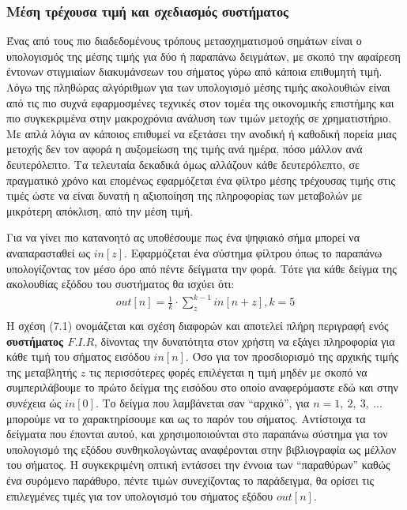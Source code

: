 \documentclass[breaklines=true, 12pt]{article}
\begin{document}
\subsubsection{Μέση τρέχουσα τιμή και σχεδιασμός συστήματος}
\label{sec:org3b6771d}
Ένας από τους πιο διαδεδομένους τρόπους μετασχηματισμού σημάτων είναι ο υπολογισμός
της μέσης τιμής για δύο ή παραπάνω δειγμάτων, με σκοπό την αφαίρεση έντονων στιγμιαίων
διακυμάνσεων του σήματος γύρω από κάποια επιθυμητή τιμή. Λόγω της πληθώρας αλγόριθμων
για των υπολογισμό μέσης τιμής ακολουθιών είναι από τις πιο συχνά εφαρμοσμένες τεχνικές
στον τομέα της οικονομικής επιστήμης και πιο συγκεκριμένα στην μακροχρόνια ανάλυση των
τιμών μετοχής σε χρηματιστήριο. Με απλά λόγια αν κάποιος επιθυμεί να εξετάσει την
ανοδική ή καθοδική πορεία μιας μετοχής δεν τον αφορά η αυξομείωση της τιμής ανά ημέρα,
πόσο μάλλον ανά δευτερόλεπτο. Τα τελευταία δεκαδικά όμως αλλάζουν κάθε δευτερόλεπτο, σε
πραγματικό χρόνο και επομένως εφαρμόζεται ένα φίλτρο μέσης τρέχουσας τιμής στις τιμές
ώστε να είναι δυνατή η αξιοποίηση της πληροφορίας των μεταβολών με μικρότερη απόκλιση,
από την μέση τιμή.

Για να γίνει πιο κατανοητό ας υποθέσουμε πως ένα ψηφιακό σήμα μπορεί να αναπαρασταθεί
ως \(in[z]\). Εφαρμόζεται ένα σύστημα φίλτρου όπως το παραπάνω υπολογίζοντας τον μέσο όρο από
πέντε δείγματα την φορά. Τότε για κάθε δείγμα της ακολουθίας εξόδου του συστήματος θα
ισχύει ότι:
\begin{equation}
\begin{align}
out[n] = \frac{1}{k} \cdot \sum_{z}^{{k-1}}in[n+z], k=5 \\
\end{align}
\end{equation}
Η σχέση (7.1) ονομάζεται και σχέση διαφορών και αποτελεί πλήρη περιγραφή ενός \textbf{συστήματος
\(F.I.R\)}, δίνοντας την δυνατότητα στον χρήστη να εξάγει πληροφορία για κάθε τιμή του σήματος
εισόδου \(in[n]\). Όσο για τον προσδιορισμό της αρχικής τιμής της μεταβλητής \(z\) τις περισσότερες
φορές επιλέγεται η τιμή μηδέν με σκοπό να συμπεριλάβουμε το πρώτο δείγμα της εισόδου
στο οποίο αναφερόμαστε εδώ και στην συνέχεια ώς \(in[0]\). Το δείγμα που λαμβάνεται σαν “αρχικό”,
για \(n = 1,\ 2,\ 3,\ ...\) μπορούμε να το χαρακτηρίσουμε και ως το παρόν του σήματος. Αντίστοιχα τα
δείγματα που έπονται αυτού, και χρησιμοποιούνται στο παραπάνω σύστημα για τον υπολογισμό
της εξόδου συνθηκολογώντας αναφέρονται στην βιβλιογραφία ως μέλλον του σήματος. Η
συγκεκριμένη οπτική εντάσσει την έννοια των “παραθύρων” καθώς ένα συρόμενο παράθυρο, πέντε
τιμών συνεχίζοντας το παράδειγμα, θα ορίσει τις επιλεγμένες τιμές για τον υπολογισμό του
σήματος εξόδου \(out[n]\).
\end{document}
